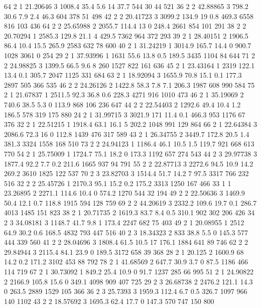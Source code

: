 64	2	1	21.20646	3	1008.4	35.4	5.6		14		37.7	544		30		44		521
36	2	2	42.88865	3	798.2	30.6	7.9		2.4		46.3	604		378		51		498
42	2	2	20.41723	3	3099.2	134.9	19		0.8		469.3	6558	816		103		436
64	2	2	25.65988	2	2055.7	114.4	13		0		248.4	2661	854		101		291
38	2	2	20.70294	1	2585.3	129.8	21.1	4		429.5	7362	964		372		293
39	2	1	28.40151	2	1906.5	86.4	10.4	15.5	265.9	2583	632		78		600
40	2	1	31.24219	1	3014.9	165.7	14.4	0		900.7	1028	3061	0		254
29	2	1	37.93996	1	1631	55.6	13.8	0.5		189.5	3435	1104	84		644
71	2	2	24.98825	3	1399.5	66.5	9.6		8		260		1527	822		161		636
45	2	1	23.43164	1	2319	122.1	13.4	0.1		305.7	2047	1125	331		684
63	2	1	18.92094	3	1655.9	70.8	15.1	0.1		177.3	2897	505		366		535
46	2	2	24.26126	2	1422.8	58.3	7.8		7.1		206.3	1987	608		990		584
75	2	1	21.67837	1	2511.5	92.3	36.8	0.6		228.3	4271	916		1010	473
46	2	1	35.19069	2	740.6	38.5	5.3		0		113.9	868		106		236		647
44	2	2	22.54403	2	1292.6	49.4	10.4	1.2		186.5	578		319		175		880
24	2	1	31.99715	3	3021.9	171		11.4	0.1		466.3	953		1176	67		376
32	2	1	22.51215	1	1918.4	63.1	16.1	5		202.2	1048	991		129		864
66	2	1	22.64384	3	2086.6	72.3	16		0		112.8	1439	476		317		589
43	2	1	26.34755	2	3449.7	172.8	20.5	1.4		381.3	3324	1558	168		510
73	2	2	24.94123	1	1186.4	46.1	10.5	1.5		119.7	921		668		613		770
54	2	1	25.75009	1	1724.7	75.1	18.2	0		173.3	1192	657		274		543
44	2	3	29.97738	3	1877.4	92.2	7.7		0.2		211.6	1665	937		94		791
55	2	2	22.87713	3	2272.6	94.5	10.9	14.2	269.2	3610	1825	122		537
70	2	3	23.82703	3	1514.4	51.7	14.2	7		97.5	3317	766		232		516
32	2	2	25.45726	1	2170.3	95.1	15.2	0.2		175.2	3313	1250	167		466
33	1	1	23.26895	2	2271.1	114.6	10.4	0		574.2	1270	544		32		194
49	2	2	22.50636	3	1469.9	50.4	12.1	0.7		118.8	1915	594		128		759
69	2	2	44.20619	3	2332.2	109.6	19.7	0.1		286.7	4013	1485	151		823
38	2	1	20.71735	2	1619.3	83.7	8.4		0.5		310.1	902		302		206		426
34	2	3	34.08181	3	1148.7	41.7	9.8		1		173.4	2247	682		75		403
49	2	1	20.08955	1	2512	64.9	30.2	0.6		168.5	4832	793		447		516
40	2	3	18.34323	2	833		38.8	5.5		0		145.3	577		444		339		560
41	2	2	28.04696	3	1808.4	61.5	10.5	17		176.1	1884	641		89		746
62	2	2	29.84944	3	2115.4	84.1	23.9	0		189.5	3172	658		39		368
28	2	1	20.125	    2	1600.9	68		14.2	0.2		171.2	3102	453		88		792
78	2	1	41.68569	2	647.7	30.9	3.7		0		87.5	1186	466		114		719
67	2	1	30.73092	1	849.2	25.4	10.9	0		91.7	1237	285		66		995
51	2	1	24.90822	2	2166.9	105.8	15.6	0		349.1	4098	909		407		725
29	2	3	26.68738	2	2476.2	121.1	14.3	0		263.5	2889	1529	105		366
36	2	3	25.7393	    3	1959.3	112.4	6.7		0.5		326.7	1097	966		140		1102
43	2	2	18.57692	3	1695.3	62.4	17.7	0		147.3	570		747		150		800

